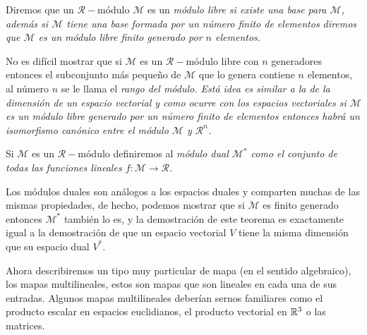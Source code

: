 \begin{definition}
	Diremos que un $\mathcal{R}-$módulo $\mathcal{M}$ es un \it{módulo libre} si existe una base para $\mathcal{M}$, además si $\mathcal{M}$ tiene una base formada por un número finito de elementos diremos que $\mathcal{M}$ es un \it{módulo libre finito generado por $n$ elementos}.
\end{definition}

No es difícil mostrar que si $\mathcal{M}$ es un $\mathcal{R}-$módulo libre con $n$ generadores entonces el subconjunto más pequeño de $\mathcal{M}$ que lo genera contiene $n$ elementos, al número $n$ se le llama el \it{rango} del módulo. Está idea es similar a la de la dimensión de un espacio vectorial y como ocurre con los espacios vectoriales si $\mathcal{M}$ es un módulo libre generado por un número finito de elementos entonces habrá un isomorfismo canónico entre el módulo $\mathcal{M}$ y $\mathcal{R}^n$.

\begin{definition}
	Si $\mathcal{M}$ es un $\mathcal{R}-$módulo definiremos al \it{módulo dual $\mathcal{M}^{*}$} como el conjunto de todas las funciones lineales $f: \mathcal{M} \to \mathcal{R}$.
\end{definition}

Los módulos duales son análogos a los espacios duales y comparten muchas de las mismas propiedades, de hecho, podemos mostrar que si $\mathcal{M}$ es finito generado entonces $\mathcal{M}^*$ también lo es, y la demostración de este teorema es exactamente igual a la demostración de que un espacio vectorial $V$ tiene la misma dimensión que su espacio dual $V^{*}$.

Ahora describiremos un tipo muy particular de mapa (en el sentido algebraico), los mapas multilineales, estos son mapas que son lineales en cada una de sus entradas. Algunos mapas multilineales deberían sernos familiares como el producto escalar en espacios euclidianos, el producto vectorial en $\mathbb{R}^3$ o las matrices.

